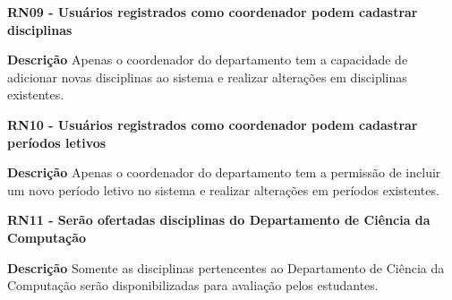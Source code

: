 \begin{description}

    \item \textbf{RN09 - Usuários registrados como coordenador podem cadastrar disciplinas} 
        \begin{description}
            \item \textbf{Descrição} Apenas o coordenador do departamento tem a capacidade de adicionar novas disciplinas ao sistema e realizar alterações em disciplinas existentes.
        \end{description}
    

    \item \textbf{RN10 - Usuários registrados como coordenador podem cadastrar períodos letivos} 
        \begin{description}
            \item \textbf{Descrição} Apenas o coordenador do departamento tem a permissão de incluir um novo período letivo no sistema e realizar alterações em períodos existentes.
        \end{description}
    

    \item \textbf{RN11 - Serão ofertadas disciplinas do Departamento de Ciência da Computação} 
        \begin{description}
            \item \textbf{Descrição} Somente as disciplinas pertencentes ao Departamento de Ciência da Computação serão disponibilizadas para avaliação pelos estudantes.
        \end{description}
        
  
  \end{description}

  

